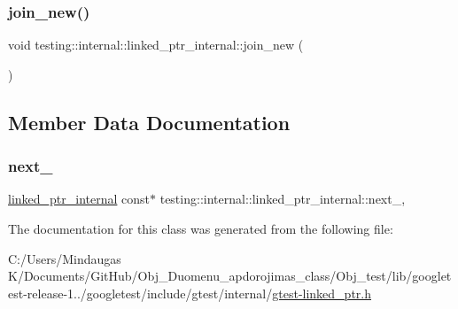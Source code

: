 \subsubsection{\texorpdfstring{join\_new()}{join\_new()}}
{\footnotesize\ttfamily void testing\+::internal\+::linked\+\_\+ptr\+\_\+internal\+::join\+\_\+new (\begin{DoxyParamCaption}{ }\end{DoxyParamCaption})\hspace{0.3cm}{\ttfamily [inline]}}



\subsection{Member Data Documentation}
\mbox{\label{classtesting_1_1internal_1_1linked__ptr__internal_ae4397a65a4d76a24547fcf2cd17131d8}} 
\subsubsection{\texorpdfstring{next\_}{next\_}}
{\footnotesize\ttfamily \mbox{\hyperlink{classtesting_1_1internal_1_1linked__ptr__internal}{linked\+\_\+ptr\+\_\+internal}} const$\ast$ testing\+::internal\+::linked\+\_\+ptr\+\_\+internal\+::next\+\_\+\hspace{0.3cm}{\ttfamily [mutable]}, {\ttfamily [private]}}



The documentation for this class was generated from the following file\+:\begin{DoxyCompactItemize}
\item 
C\+:/\+Users/\+Mindaugas K/\+Documents/\+Git\+Hub/\+Obj\+\_\+\+Duomenu\+\_\+apdorojimas\+\_\+class/\+Obj\+\_\+test/lib/googletest-\/release-\/1../googletest/include/gtest/internal/\mbox{\hyperlink{gtest-linked__ptr_8h}{gtest-\/linked\+\_\+ptr.\+h}}\end{DoxyCompactItemize}
